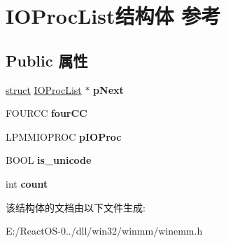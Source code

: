 \hypertarget{struct_i_o_proc_list}{}\section{I\+O\+Proc\+List结构体 参考}
\label{struct_i_o_proc_list}
\subsection*{Public 属性}
\begin{DoxyCompactItemize}
\item 
\mbox{\label{struct_i_o_proc_list_acd31b4132d39e81dead0154fffc90f00}} 
\hyperlink{interfacestruct}{struct} \hyperlink{struct_i_o_proc_list}{I\+O\+Proc\+List} $\ast$ {\bfseries p\+Next}
\item 
\mbox{\label{struct_i_o_proc_list_af45ed39afb5b291f4bbaae1df6570390}} 
F\+O\+U\+R\+CC {\bfseries four\+CC}
\item 
\mbox{\label{struct_i_o_proc_list_a609b675b7e614e1989cc5e3ac9b660d8}} 
L\+P\+M\+M\+I\+O\+P\+R\+OC {\bfseries p\+I\+O\+Proc}
\item 
\mbox{\label{struct_i_o_proc_list_a2469c8acb2097b5d67593eb2824eb325}} 
B\+O\+OL {\bfseries is\+\_\+unicode}
\item 
\mbox{\label{struct_i_o_proc_list_a78dbf6fa4e1b087bf0745f6eab49918f}} 
int {\bfseries count}
\end{DoxyCompactItemize}


该结构体的文档由以下文件生成\+:\begin{DoxyCompactItemize}
\item 
E\+:/\+React\+O\+S-\/0../dll/win32/winmm/winemm.\+h\end{DoxyCompactItemize}
